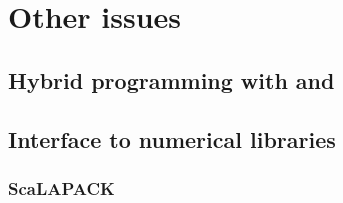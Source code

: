 \chapter{Other issues}

\section{Hybrid programming with {\MPI} and {\OMP}}

\subsection{{\MPI}}

\subsection{{\OMP}}

\section{Interface to numerical libraries}

\subsection{ScaLAPACK}

